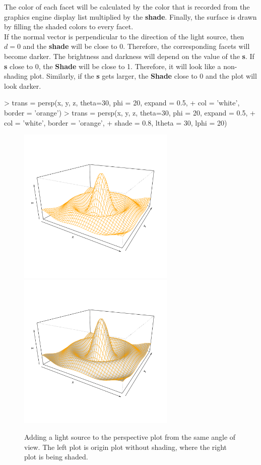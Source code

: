 \documentclass[11pt,twoside]{report}
\begin{document}
The color of each facet will be calculated by the color that is recorded from the graphics engine display list multiplied by the \textbf{shade}. Finally, the surface is drawn by filling the shaded colors to every facet.\\

If the normal vector is perpendicular to the direction of the light source, then $d = 0$ and the \textbf{shade} will be close to 0. Therefore, the corresponding facets will become darker. The brightness and darkness will depend on the value of the \textbf{s}. If \textbf{s} close to 0, the \textbf{Shade} will be close to 1. Therefore, it will look like a non-shading plot. Similarly, if the \textbf{s} gets larger, the \textbf{Shade} close to 0 and the plot will look darker.

\begin{Schunk}
\begin{Sinput}
> trans = persp(x, y, z, theta=30, phi = 20, expand = 0.5,
+               col = 'white', border = 'orange')
> trans = persp(x, y, z, theta=30, phi = 20, expand = 0.5,
+               col = 'white', border = 'orange', 
+               shade = 0.8, ltheta = 30, lphi = 20)
\end{Sinput}
\end{Schunk}


\begin{figure}[h]
	\begin{center}
		\includegraphics[height = 7.5cm, width = 7.5cm]{figure/Lighting_1.pdf}
		\includegraphics[height = 7.5cm, width = 7.5cm]{figure/Lighting_2.pdf}
		\caption{Adding a light source to the perspective plot from the same angle of view. The left plot is origin plot without shading, where the right plot is being shaded.}
		\label{figure_3.3}
	\end{center}
\end{figure}
\end{document}
